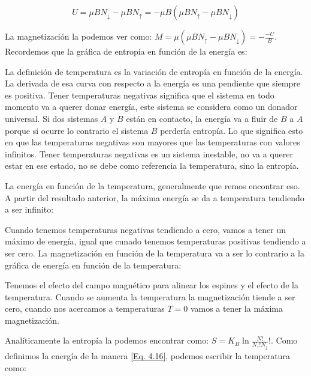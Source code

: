 \documentclass[11pt,fleqn]{book}
\begin{document}
\begin{equation}
    U=\mu BN_{\downarrow}-\mu BN_{\uparrow}=-\mu B(\mu BN_{\uparrow}-\mu BN_{\downarrow})
    \label{Eq. 4.16}
\end{equation}

La magnetización la podemos ver como: $M=\mu(\mu BN_{\uparrow}-\mu BN_{\downarrow})=-\frac{-U}{B}$. Recordemos que la gráfica de entropía en función de la energía es:


La definición de temperatura es la variación de entropía en función de la energía. La derivada de esa curva con respecto a la energía es una pendiente que siempre es positiva. Tener temperaturas negativas significa que el sistema en todo momento va a querer donar energía, este sistema se considera como un donador universal. Si dos sistemas $A$ y $B$ están en contacto, la energía va a fluir de $B$ a $A$ porque si ocurre lo contrario el sistema $B$ perdería entropía. Lo que significa esto en que las temperaturas negativas son mayores que las temperaturas con valores infinitos. Tener temperaturas negativas es un sistema inestable, no va a querer estar en ese estado, no se debe como referencia la temperatura, sino la entropía.

La energía en función de la temperatura, generalmente que remos encontrar eso. A partir del resultado anterior, la máxima energía se da a temperatura tendiendo a ser infinito:



Cuando tenemos temperaturas negativas tendiendo a cero, vamos a tener un máximo de energía, igual que cunado tenemos temperaturas positivas tendiendo a ser cero. La magnetización en función de la temperatura va a ser lo contrario a la gráfica de energía en función de la temperatura:



Tenemos el efecto del campo magnético para alinear los espines y el efecto de la temperatura. Cuando se aumenta la temperatura la magnetización tiende a ser cero, cuando nos acercamos a temperaturas $T=0$ vamos a tener la máxima magnetización.

Analíticamente la entropía la podemos encontrar como: $S=K_{B}\ln{\frac{N!}{N_{\uparrow}!N_{\downarrow}}!}$. Como definimos la energía de la manera \ref{Eq. 4.16}, podemos escribir la temperatura como:
\end{document}
